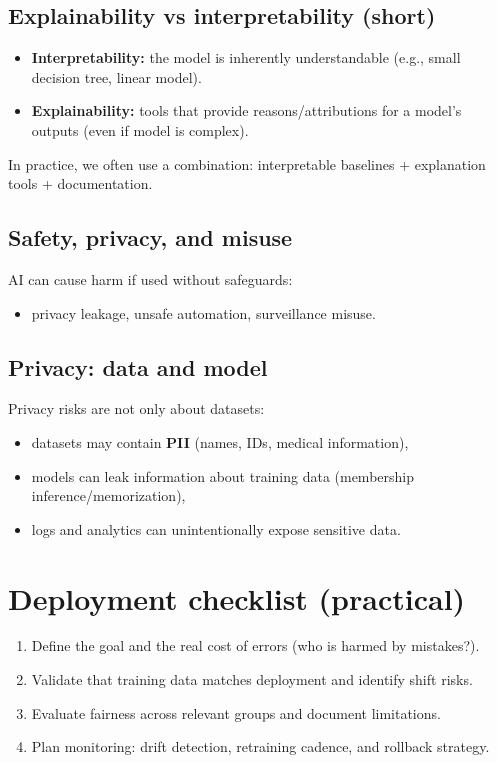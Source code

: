 \documentclass[11pt]{article}
\begin{document}
\subsection{Explainability vs interpretability (short)}
\begin{itemize}[leftmargin=*]
  \item \textbf{Interpretability:} the model is inherently understandable (e.g., small decision tree, linear model).
  \item \textbf{Explainability:} tools that provide reasons/attributions for a model's outputs (even if model is complex).
\end{itemize}
In practice, we often use a combination: interpretable baselines + explanation tools + documentation.

\subsection{Safety, privacy, and misuse}
AI can cause harm if used without safeguards:
\begin{itemize}[leftmargin=*]
  \item privacy leakage, unsafe automation, surveillance misuse.
\end{itemize}

\subsection{Privacy: data and model}
Privacy risks are not only about datasets:
\begin{itemize}[leftmargin=*]
  \item datasets may contain \textbf{PII} (names, IDs, medical information),
  \item models can leak information about training data (membership inference/memorization),
  \item logs and analytics can unintentionally expose sensitive data.
\end{itemize}

\section{Deployment checklist (practical)}
\begin{enumerate}[leftmargin=*]
  \item Define the goal and the real cost of errors (who is harmed by mistakes?).
  \item Validate that training data matches deployment and identify shift risks.
  \item Evaluate fairness across relevant groups and document limitations.
  \item Plan monitoring: drift detection, retraining cadence, and rollback strategy.
\end{enumerate}
\end{document}
